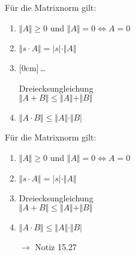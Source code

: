 \documentclass[11pt]{article}
\renewcommand{\cite}[1]{\par\bigskip\hfill{\color{gray}\tiny\(\to\) #1}}
\renewcommand{\leq}{\leqslant}
\renewcommand{\geq}{\geqslant}
\newcommand{\hide}[1]{\parbox{0cm}{\raisebox{-7pt}[0cm]{\dots}}\color{white}#1\color{black}}
\let\olddots\dots
\renewcommand{\dots}{\,\olddots\,}
\newenvironment{field}{}{\newpage}
\newif\ifnote
\newenvironment{note}{\notetrue}{\notefalse}
\begin{document}
\begin{note}
    \begin{field}
        Für die Matrixnorm gilt:
        \begin{enumerate}[(1)]
            \item $\Vert A \Vert \geq 0$ und $\Vert A \Vert = 0 \Leftrightarrow A = 0$
            \item $\Vert s\cdot A\Vert = \vert s \vert\cdot\Vert A \Vert$
            \item \hide{Dreiecksungleichung\\
            $\Vert A+B\Vert \leq \Vert A\Vert+\Vert B \Vert$}
            \item $\Vert A\cdot B\Vert \leq \Vert A\Vert\cdot\Vert B \vert$
        \end{enumerate}
    \end{field}
    \begin{field}
        Für die Matrixnorm gilt:
        \begin{enumerate}[(1)]
            \item $\Vert A \Vert \geq 0$ und $\Vert A \Vert = 0 \Leftrightarrow A = 0$
            \item $\Vert s\cdot A\Vert = \vert s \vert\cdot\Vert A \Vert$
            \item Dreiecksungleichung\\
            $\Vert A+B\Vert \leq \Vert A\Vert+\Vert B \Vert$
            \item $\Vert A\cdot B\Vert \leq \Vert A\Vert\cdot\Vert B \vert$
            \cite{Notiz 15.27}
        \end{enumerate}
    \end{field}


\end{note}
\end{document}
